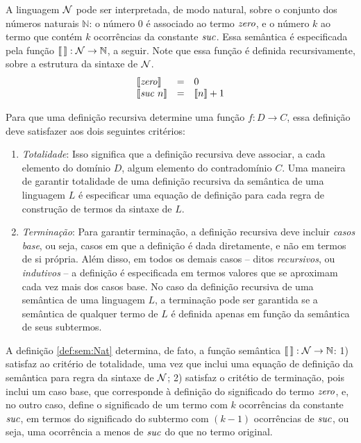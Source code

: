 \begin{Definition}\label{def:sem:Nat}
A linguagem $\mathcal{N}$ pode ser interpretada, de modo natural, sobre o conjunto dos números naturais $\mathbb{N}$: o número $0$ é associado ao termo $\textit{zero\/}$, e o número $k$ ao termo que contém $k$ ocorr\^encias da constante $\textit{suc\/}$. Essa semântica é especificada pela função $\llbracket\,\rrbracket : \mathcal{N} \rightarrow \mathbb{N}$, a seguir. Note que essa função é definida recursivamente, sobre a estrutura da sintaxe de $\mathcal{N}$.
\[
\begin{array}{lcl}
\llbracket \textit{zero\/} \rrbracket & = & 0\\
\llbracket \textit{suc\/}\,\,n\rrbracket & = & \llbracket n \rrbracket + 1
\end{array}
\]
\end{Definition}
Para que uma definição recursiva determine uma função $f : D \rightarrow C$, essa definição deve satisfazer aos dois seguintes crit\'erios:
\begin{enumerate}

\item \emph{Totalidade\/}: Isso significa que a definição recursiva deve associar, a cada elemento do domínio $D$, algum elemento do contradomínio $C$.  Uma maneira de garantir totalidade de uma definição recursiva da semântica de uma linguagem $L$ é especificar uma equa\c{c}\~ao de definição para cada regra de construção de termos da sintaxe de $L$.


\item \emph{Terminação\/}: Para garantir terminação, a definição recursiva deve incluir \emph{casos base\/}, ou seja, casos em que a definição é dada diretamente, e não em termos de si própria. Além disso, em todos os demais casos -- ditos \emph{recursivos\/}, ou \emph{indutivos\/} --  a definição é especificada em termos valores que se aproximam cada vez mais dos casos base. No caso da definição recursiva de uma semântica de uma linguagem $L$, a terminação pode ser garantida se a semântica de qualquer termo de $L$ é definida apenas em função da semântica de seus subtermos.
\end{enumerate}

A definição \ref{def:sem:Nat} determina, de fato, a função semântica $\llbracket\,\rrbracket : \mathcal{N} \rightarrow \mathbb{N}$: 1) satisfaz ao critério de totalidade, uma vez que inclui uma equação de definição da semântica para regra da sintaxe de $\mathcal{N}$; 2) satisfaz o critétio de terminação, pois inclui um caso base, que corresponde à definição do significado do termo $\textit{zero\/}$, e, no outro caso, define o significado de um termo com $k$ ocorrências da constante $\textit{suc\/}$,  em termos do significado do subtermo com $(k-1)$ ocorrências de $\textit{suc\/}$, ou seja, uma ocorrência a menos de $\textit{suc\/}$ do que no termo original.

